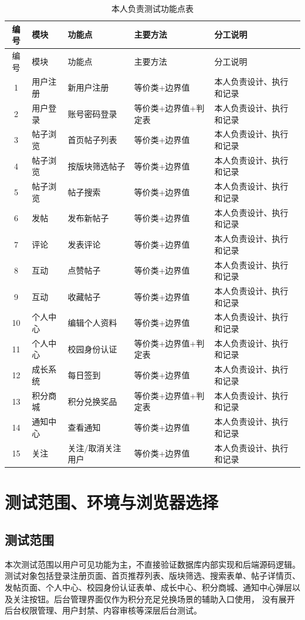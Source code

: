 \documentclass[bwprint]{report}
\begin{document}
\begin{longtable}{c p{} p{} p{} p{}}
\caption{本人负责测试功能点表}\label{tab:assignment}\\
\toprule
编号 & 模块 & 功能点 & 主要方法 & 分工说明 \\
\midrule
\endfirsthead
\toprule
编号 & 模块 & 功能点 & 主要方法 & 分工说明 \\
\midrule
\endhead
1 & 用户注册 & 新用户注册 & 等价类+边界值 & 本人负责设计、执行和记录 \\
2 & 用户登录 & 账号密码登录 & 等价类+边界值+判定表 & 本人负责设计、执行和记录 \\
3 & 帖子浏览 & 首页帖子列表 & 等价类+边界值 & 本人负责设计、执行和记录 \\
4 & 帖子浏览 & 按版块筛选帖子 & 等价类+边界值 & 本人负责设计、执行和记录 \\
5 & 帖子浏览 & 帖子搜索 & 等价类+边界值 & 本人负责设计、执行和记录 \\
6 & 发帖 & 发布新帖子 & 等价类+边界值 & 本人负责设计、执行和记录 \\
7 & 评论 & 发表评论 & 等价类+边界值 & 本人负责设计、执行和记录 \\
8 & 互动 & 点赞帖子 & 等价类+边界值 & 本人负责设计、执行和记录 \\
9 & 互动 & 收藏帖子 & 等价类+边界值 & 本人负责设计、执行和记录 \\
10 & 个人中心 & 编辑个人资料 & 等价类+边界值 & 本人负责设计、执行和记录 \\
11 & 个人中心 & 校园身份认证 & 等价类+边界值+判定表 & 本人负责设计、执行和记录 \\
12 & 成长系统 & 每日签到 & 等价类+边界值 & 本人负责设计、执行和记录 \\
13 & 积分商城 & 积分兑换奖品 & 等价类+边界值+判定表 & 本人负责设计、执行和记录 \\
14 & 通知中心 & 查看通知 & 等价类+边界值 & 本人负责设计、执行和记录 \\
15 & 关注 & 关注/取消关注用户 & 等价类+边界值 & 本人负责设计、执行和记录 \\
\bottomrule
\end{longtable}

\section{测试范围、环境与浏览器选择}
\subsection{测试范围}
本次测试范围以用户可见功能为主，不直接验证数据库内部实现和后端源码逻辑。测试对象包括登录注册页面、首页推荐列表、版块筛选、搜索表单、帖子详情页、
发帖页面、个人中心、校园身份认证表单、成长中心、积分商城、通知中心弹层以及关注按钮。后台管理界面仅作为积分充足兑换场景的辅助入口使用，
没有展开后台权限管理、用户封禁、内容审核等深层后台测试。
\end{document}
